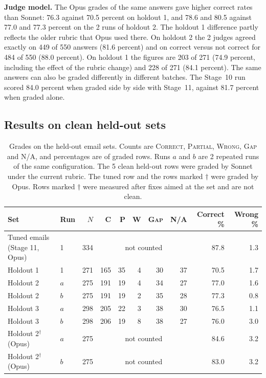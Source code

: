 \textbf{Judge model.} The Opus grades of the same answers gave higher correct rates than Sonnet: 76.3 against 70.5 percent on holdout 1, and 78.6 and 80.5 against 77.0 and 77.3 percent on the 2 runs of holdout 2. The holdout 1 difference partly reflects the older rubric that Opus used there. On holdout 2 the 2 judges agreed exactly on 449 of 550 answers (81.6 percent) and on correct versus not correct for 484 of 550 (88.0 percent). On holdout 1 the figures are 203 of 271 (74.9 percent, including the effect of the rubric change) and 228 of 271 (84.1 percent). The same answers can also be graded differently in different batches. The Stage~10 run scored 84.0 percent when graded side by side with Stage~11, against 81.7 percent when graded alone.

\subsection{Results on clean held-out sets}

\begin{table}[htbp]
\centering
\caption[Grades on the held-out email sets]{Grades on the held-out email sets. Counts are \textsc{Correct}, \textsc{Partial}, \textsc{Wrong}, \textsc{Gap} and \textsc{N/A}, and percentages are of graded rows. Runs $a$ and $b$ are 2 repeated runs of the same configuration. The 5 clean held-out rows were graded by Sonnet under the current rubric. The tuned row and the rows marked $\dagger$ were graded by Opus. Rows marked $\dagger$ were measured after fixes aimed at the set and are not clean.}
\label{tab:live-holdout}
\small
\setlength{\tabcolsep}{4pt}
\begin{tabular}{@{}llrrrrrrrr@{}}
\toprule
Set & Run & $N$ & C & P & W & \textsc{Gap} & N/A & Correct \% & Wrong \% \\
\midrule
Tuned emails (Stage 11, Opus) & 1 & 334 & \multicolumn{5}{c}{not counted} & 87.8 & 1.3 \\
Holdout 1 & 1 & 271 & 165 & 35 & 4 & 30 & 37 & 70.5 & 1.7 \\
Holdout 2 & $a$ & 275 & 191 & 19 & 4 & 34 & 27 & 77.0 & 1.6 \\
Holdout 2 & $b$ & 275 & 191 & 19 & 2 & 35 & 28 & 77.3 & 0.8 \\
Holdout 3 & $a$ & 298 & 205 & 22 & 3 & 38 & 30 & 76.5 & 1.1 \\
Holdout 3 & $b$ & 298 & 206 & 19 & 8 & 38 & 27 & 76.0 & 3.0 \\
\midrule
Holdout 2$^\dagger$ (Opus) & $a$ & 275 & \multicolumn{5}{c}{not counted} & 84.6 & 3.2 \\
Holdout 2$^\dagger$ (Opus) & $b$ & 275 & \multicolumn{5}{c}{not counted} & 83.0 & 3.2 \\
\bottomrule
\end{tabular}
\end{table}

